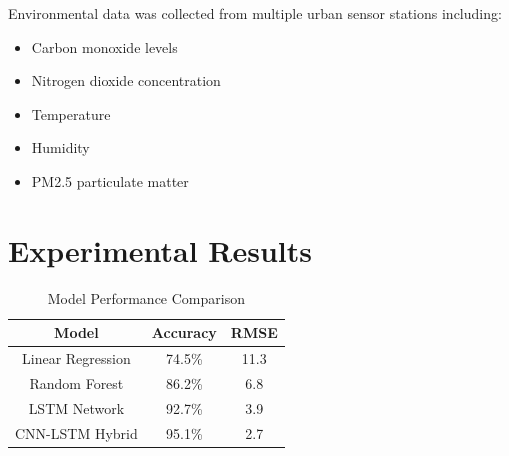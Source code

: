 \documentclass[12pt,a4paper]{article}
\begin{document}
	Environmental data was collected from multiple urban sensor stations including:
	
	\begin{itemize}
		
		\item Carbon monoxide levels
		
		\item Nitrogen dioxide concentration
		
		\item Temperature
		
		\item Humidity
		
		\item PM2.5 particulate matter
		
	\end{itemize}
	
	
	\section{Experimental Results}
	
	\begin{table}[h]
		
		\centering
		
		\caption{Model Performance Comparison}
		
		\begin{tabular}{|c|c|c|}
			
			\hline
			
			Model & Accuracy & RMSE \\
			
			\hline
			
			Linear Regression & 74.5\% & 11.3 \\
			
			\hline
			
			Random Forest & 86.2\% & 6.8 \\
			
			\hline
			
			LSTM Network & 92.7\% & 3.9 \\
			
			\hline
			
			CNN-LSTM Hybrid & 95.1\% & 2.7 \\
			
			\hline
			
		\end{tabular}
		
	\end{table}
	
\end{document}
